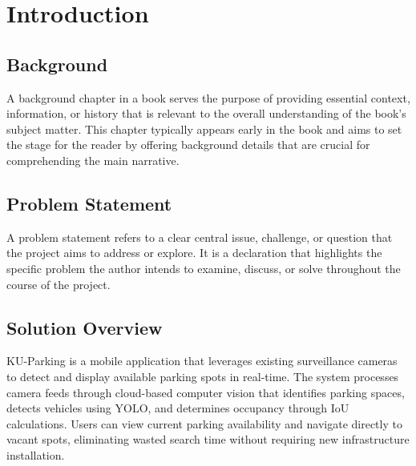 \chapter{Introduction}
\label{chap:introduction}

\section{Background}
\label{section:background}

A background chapter in a book serves the purpose of providing essential context, information, or history that is relevant
to the overall understanding of the book's subject matter. This chapter typically appears early in the book and aims to set the
stage for the reader by offering background details that are crucial for comprehending the main narrative.

\section{Problem Statement}
\label{section:problem-statement}

A problem statement refers to a clear central issue,
challenge, or question that the project aims to address or explore. It is a
declaration that highlights the specific problem the author intends to examine,
discuss, or solve throughout the course of the project.

\section{Solution Overview}
\label{section:solution-overview}

KU-Parking is a mobile application that leverages existing surveillance cameras to detect and display available parking spots in real-time.
The system processes camera feeds through cloud-based computer vision that identifies parking spaces, detects vehicles using YOLO, and determines occupancy through IoU calculations.
Users can view current parking availability and navigate directly to vacant spots, eliminating wasted search time without requiring new infrastructure installation.


